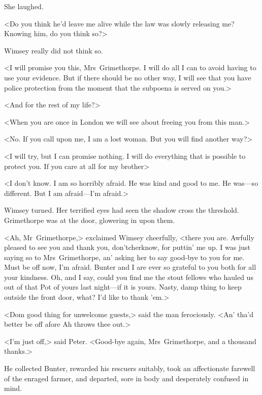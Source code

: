 She laughed.

<Do you think he'd leave me alive while the law was slowly releasing me? Knowing him, do you think so?>

Wimsey really did not think so.

<I will promise you this, Mrs~Grimethorpe. I will do all I can to avoid having to use your evidence. But if there should be no other way, I will see that you have police protection from the moment that the subpoena is served on you.>

<And for the rest of my life?>

<When you are once in London we will see about freeing you from this man.>

<No. If you call upon me, I am a lost woman. But you will find another way?>

<I will try, but I can promise nothing. I will do everything that is possible to protect you. If you care at all for my brother\longdash>

<I don't know. I am so horribly afraid. He was kind and good to me. He was—so different. But I am afraid—I'm afraid.>

Wimsey turned. Her terrified eyes had seen the shadow cross the threshold. Grimethorpe was at the door, glowering in upon them.

<Ah, Mr~Grimethorpe,> exclaimed Wimsey cheerfully, <there you are.  Awfully pleased to see you and thank you, don'tcherknow, for puttin' me up. I was just saying so to Mrs~Grimethorpe, an' asking her to say good-bye to you for me. Must be off now, I'm afraid. Bunter and I are ever so grateful to you both for all your kindness. Oh, and I say, could you find me the stout fellows who hauled us out of that Pot of yours last night—if it is yours. Nasty, damp thing to keep outside the front door, what? I'd like to thank 'em.>

<Dom good thing for unwelcome guests,> said the man ferociously. <An' tha'd better be off afore Ah throws thee out.>

<I'm just off,> said Peter. <Good-bye again, Mrs~Grimethorpe, and a thousand thanks.>

He collected Bunter, rewarded his rescuers suitably, took an affectionate farewell of the enraged farmer, and departed, sore in body and desperately confused in mind. 
